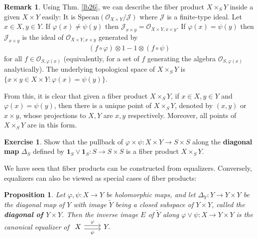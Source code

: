 \documentclass[12pt,b5paper,notitlepage]{report}
\theoremstyle{definition}
\newtheorem{exe}[df]{Exercise}
\newtheorem{rem}[df]{Remark}
\theoremstyle{plain}
\newtheorem{pp}[df]{Proposition}
\newcommand{\mc}{\mathcal}
\newcommand{\wtd}{\widetilde}
\newcommand{\id}{\mathbf{1}}
\newcommand{\scr}{\mathscr}
\newcommand{\Specan}{\mathrm{Specan}}
\numberwithin{equation}{section}
\begin{document}
\begin{rem}\label{lb101}
Using Thm. \ref{lb26}, we can describe the fiber product $X\times_SY$ inside a given $X\times Y$ easily: It is $\Specan(\scr O_{X\times Y}/\mc J)$ where $\mc J$ is a finite-type ideal. Let $x\in X,y\in Y$. If $\varphi(x)\neq\psi(y)$ then $\mc J_{x\times y}=\scr O_{X\times Y,x\times y}$. If $\varphi(x)=\psi(y)$ then $\mc J_{x\times y}$ is the ideal of $\scr O_{X\times Y,x\times y}$ generated by
\begin{align}
(f\circ\varphi)\otimes 1-1\otimes (f\circ\psi)
\end{align}
for all $f\in\scr O_{S,\varphi(x)}$ (equivalently, for a set of $f$ generating the algebra $\scr O_{S,\varphi(x)}$ analytically). The underlying topological space of $X\times_SY$ is  $\{x\times y\in X\times Y:\varphi(x)=\psi(y)\}$.

From this, it is clear that given a fiber product $X\times_SY$, if $x\in X,y\in Y$ and $\varphi(x)=\psi(y)$, then there is a unique point of $X\times_SY$, denoted by $(x,y)$ or $x\times y$,  whose projections to $X,Y$ are $x,y$ respectively. Moreover, all points of $X\times_SY$ are in this form. \hfill\qedsymbol
\end{rem}

\begin{exe}
Show that the pullback of $\varphi\times\psi:X\times Y\rightarrow S\times S$ along the \textbf{diagonal map} $\Delta_S$ defined by $\id_S\vee\id_S:S\rightarrow S\times S$ is a fiber product $X\times_SY$.
\end{exe}


We have seen that fiber products can be constructed from equalizers. Conversely, equalizers can also be viewed as special cases of fiber products:

\begin{pp}
Let $\varphi,\psi:X\rightarrow Y$ be holomorphic maps, and let $\Delta_Y:Y\rightarrow Y\times Y$ be the diagonal map of $Y$ with image $\wtd Y$ being a closed subspace of $Y\times Y$, called the \textbf{diagonal of $Y\times Y$}.  Then the inverse image $E$ of $\wtd Y$ along $\varphi\vee\psi:X\rightarrow Y\times Y$ is the canonical equalizer of $\begin{tikzcd}
X\arrow[r,shift right,"\psi"']\arrow[r,shift left,"\varphi"]& Y.
\end{tikzcd}$
\end{pp}
\end{document}
